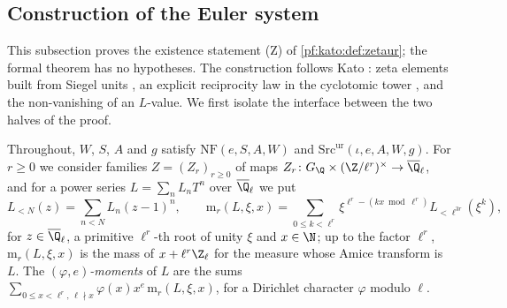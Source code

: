 \subsection{Construction of the Euler system}\label{pf:kato:sec:zeta}

This subsection proves the existence statement \textup{(Z)} of \cref{pf:kato:def:zetaur}; the formal theorem has no
hypotheses. The construction follows Kato \cite{Kato2004}: zeta elements built from Siegel units \cite{KubertLang1981},
an explicit reciprocity law in the cyclotomic tower \cite{CoatesWiles1977,Coleman1979}, and the non-vanishing of an
$L$-value. We first isolate the interface between the two halves of the proof.

Throughout, $W$, $S$, $A$ and $g$ satisfy $\mathrm{NF}(e,S,A,W)$ and $\mathrm{Src}^{\mathrm{ur}}(\iota,e,A,W,g)$. For
$r\ge0$ we consider families $Z=(Z_r)_{r\ge0}$ of maps $Z_r\colon G_\Q\times(\Z/\ell^r)^\times\to\katoQlb$, and for a power
series $L=\sum_nL_nT^n$ over $\katoQlb$ we put
\[
  L_{<N}(z)=\sum_{n<N}L_n(z-1)^n,\qquad
  \mathrm{m}_r(L,\xi,x)=\sum_{0\le k<\ell^r}\xi^{\ell^r-(kx\bmod\ell^r)}L_{<\ell^{3r}}(\xi^k),
\]
for $z\in\katoQlb$, a primitive $\ell^r$-th root of unity $\xi$ and $x\in\N$; up to the factor $\ell^r$, $\mathrm{m}_r(L,\xi,x)$ is the
mass of $x+\ell^r\Z_\ell$ for the measure whose Amice transform is $L$. The \emph{$(\varphi,e)$-moments} of $L$ are the sums
$\sum_{0\le x<\ell^r,\,\ell\nmid x}\varphi(x)x^e\,\mathrm{m}_r(L,\xi,x)$, for a Dirichlet character $\varphi$ modulo $\ell$.

